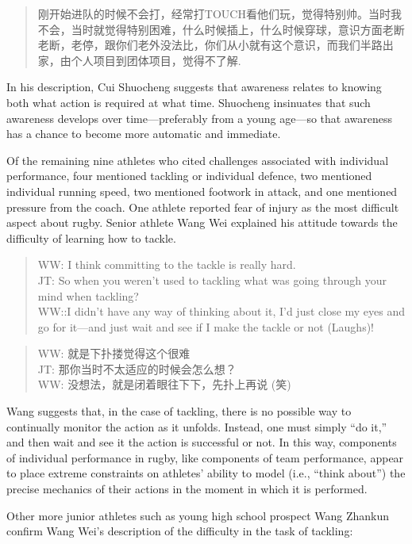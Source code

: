 \begin{CJK}{UTF8}{gbsn}
    \begin{quote}
      刚开始进队的时候不会打，经常打TOUCH看他们玩，觉得特别帅。当时我不会，当时就觉得特别困难，什么时候插上，什么时候穿球，意识方面老断老断，老停，跟你们老外没法比，你们从小就有这个意识，而我们半路出家，由个人项目到团体项目，觉得不了解.
    \end{quote}

In his description, Cui Shuocheng suggests that awareness relates to knowing both what action is required at what time.  Shuocheng insinuates that such awareness develops over time---preferably from a young age---so that awareness has a chance to become more automatic and immediate.

Of the remaining nine athletes who cited challenges associated with individual performance, four mentioned tackling or individual defence, two mentioned individual running speed, two mentioned footwork in attack, and one mentioned pressure from the coach.  One athlete reported fear of injury as the most difficult aspect about rugby.   Senior athlete Wang Wei explained his attitude towards the difficulty of learning how to tackle.

\begin{quote}
  WW: I think committing to the tackle is really hard. \\
  JT: So when you weren’t used to tackling what was going through your mind when tackling? \\
  WW::I didn’t have any way of thinking about it, I’d just close my eyes and go for it---and just wait and see if I make the tackle or not (Laughs)!
\end{quote}

\begin{quote}
  WW: 就是下扑搂觉得这个很难 \\
  JT: 那你当时不太适应的时候会怎么想？\\
  WW: 没想法，就是闭着眼往下下，先扑上再说 (笑)
\end{quote}

Wang suggests that, in the case of tackling, there is no possible way to continually monitor the action as it unfolds.  Instead, one must simply ``do it,'' and then wait and see it the action is successful or not.  In this way, components of individual performance in rugby, like components of team performance, appear to place extreme constraints on athletes' ability to model (i.e., ``think about'') the precise mechanics of their actions in the moment in which it is performed.

Other more junior athletes such as young high school prospect Wang Zhankun confirm Wang Wei's description of the difficulty in the task of tackling:


\end{CJK}
